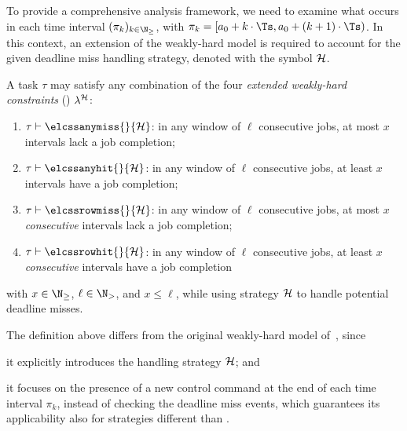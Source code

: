 To provide a comprehensive analysis framework, we need to examine what occurs in each time interval $(\pi_k)_{k \in \N_{\geq}}$, with $\pi_k = [a_0 + k\cdot \Ts, a_0 + (k+1)\cdot \Ts)$.
In this context, an extension of the weakly-hard model is required to account for the given deadline miss handling strategy, denoted with the symbol $\mathcal{H}$.
%
\begin{definition}%
    \label{def:new-mk}%
    A task $\tau$ may satisfy any combination of the four \emph{extended weakly-hard constraints} (\ewhc{}) $\lambda^{\mathcal{H}}$:
    \begin{enumerate}[label=(\roman*)]
        \item $\tau \vdash \elcssanymiss{}{\strat}$: in any window of $\ell$ consecutive jobs, at most $x$ intervals lack a job completion;
        \item $\tau \vdash \elcssanyhit{}{\strat}$:  in any window of $\ell$ consecutive jobs, at least $x$ intervals have a job completion;
        \item $\tau \vdash \elcssrowmiss{}{\strat}$: in any window of $\ell$ consecutive jobs, at most $x$ \emph{consecutive} intervals lack a job completion;
        \item $\tau \vdash \elcssrowhit{}{\strat}$: in any window of $\ell$ consecutive jobs, at least $x$ \emph{consecutive} intervals have a job completion
    \end{enumerate}
    with $x\in \N_{\geq}$, $\ell \in \N_{>}$, and $x\leq \ell$, while using strategy $\mathcal{H}$ to handle potential deadline misses.
\end{definition}
%
The definition above differs from the original weakly-hard model of~\cite{Bernat:2001}, since
\begin{enumerate*}[label=(\roman*)]
    \item it explicitly introduces the handling strategy $\mathcal{H}$; and
    \item it focuses on the presence of a new control command at the end of each time interval $\pi_k$, instead of checking the deadline miss events, which guarantees its applicability also for strategies different than \tK{}.
\end{enumerate*}

